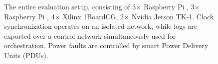 \begin{figure}
    \caption{The entire evaluation setup, consisting of 3$\times$ Raspberry Pi
    {}, 3$\times$ Raspberry Pi {}, 4$\times$ {\sffamily
    X}ilinx 1BoardCG, 2$\times$ {\sffamily N}vidia Jetson TK-1.
    Clock synchronization operates on an isolated network, while logs are
    exported over a control network simultaneously used for orchestration.
    Power faults are controlled by smart Power Delivery Units (PDUs).}
    \label{fig:testbed}
\end{figure}
